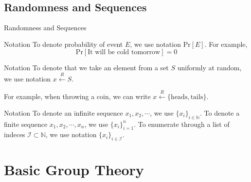 \documentclass{beamer}
\begin{document}
    \subsection{Randomness and Sequences}

    \begin{frame}{Randomness and Sequences}
        \begin{block}{Notation}
          To denote probability of event $E$, we use notation $\text{Pr}[E]$. For example,
          \begin{equation*}
              \text{Pr}[\text{It will be cold tomorrow}] = 0
          \end{equation*}
        \end{block}
        \pause

        \begin{block}{Notation}
            To denote that we take an element from a set $S$ uniformly at random, we use notation $x \xleftarrow{R} S$.

            For example, when throwing a coin, we can write $x \xleftarrow{R} \{\text{heads}, \text{tails}\}$.
        \end{block}
        \pause

        \begin{block}{Notation}
          To denote an infinite sequence $x_1,x_2,\cdots$, we use $\{x_i\}_{i \in \mathbb{N}}$. To denote
          a finite sequence $x_1,x_2,\cdots,x_n$, we use $\{x_i\}_{i=1}^n$. To enumerate 
          through a list of indeces $\mathcal{I} \subset \mathbb{N}$, we use notation
          $\{x_i\}_{i \in \mathcal{I}}$.
        \end{block}
    \end{frame}

    \section{Basic Group Theory}
\end{document}
